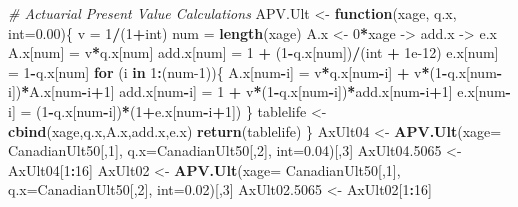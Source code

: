\documentclass[
]{book}
\newenvironment{Shaded}{\begin{snugshade}}{\end{snugshade}}
\newcommand{\CommentTok}[1]{\textcolor[rgb]{0.56,0.35,0.01}{\textit{#1}}}
\newcommand{\ControlFlowTok}[1]{\textcolor[rgb]{0.13,0.29,0.53}{\textbf{#1}}}
\newcommand{\DataTypeTok}[1]{\textcolor[rgb]{0.13,0.29,0.53}{#1}}
\newcommand{\DecValTok}[1]{\textcolor[rgb]{0.00,0.00,0.81}{#1}}
\newcommand{\FloatTok}[1]{\textcolor[rgb]{0.00,0.00,0.81}{#1}}
\newcommand{\KeywordTok}[1]{\textcolor[rgb]{0.13,0.29,0.53}{\textbf{#1}}}
\newcommand{\NormalTok}[1]{#1}
\newcommand{\OperatorTok}[1]{\textcolor[rgb]{0.81,0.36,0.00}{\textbf{#1}}}
\newcommand{\StringTok}[1]{\textcolor[rgb]{0.31,0.60,0.02}{#1}}
\begin{document}
\begin{Shaded}
\begin{Highlighting}[]
\CommentTok{#  Actuarial Present Value Calculations}
\NormalTok{APV.Ult <-}\StringTok{ }\ControlFlowTok{function}\NormalTok{(xage, q.x, }\DataTypeTok{int=}\FloatTok{0.00}\NormalTok{)\{}
\NormalTok{  v =}\StringTok{ }\DecValTok{1}\OperatorTok{/}\NormalTok{(}\DecValTok{1}\OperatorTok{+}\NormalTok{int)}
\NormalTok{  num =}\StringTok{ }\KeywordTok{length}\NormalTok{(xage)}
\NormalTok{  A.x <-}\StringTok{ }\DecValTok{0}\OperatorTok{*}\NormalTok{xage ->}\StringTok{ }\NormalTok{add.x ->}\StringTok{ }\NormalTok{e.x}
\NormalTok{  A.x[num] =}\StringTok{ }\NormalTok{v}\OperatorTok{*}\NormalTok{q.x[num]}
\NormalTok{  add.x[num] =}\StringTok{ }\DecValTok{1} \OperatorTok{+}\StringTok{ }\NormalTok{(}\DecValTok{1}\OperatorTok{-}\NormalTok{q.x[num])}\OperatorTok{/}\NormalTok{(int }\OperatorTok{+}\StringTok{ }\FloatTok{1e-12}\NormalTok{)}
\NormalTok{  e.x[num] =}\StringTok{ }\DecValTok{1}\OperatorTok{-}\NormalTok{q.x[num]}
  \ControlFlowTok{for}\NormalTok{ (i }\ControlFlowTok{in} \DecValTok{1}\OperatorTok{:}\NormalTok{(num}\DecValTok{-1}\NormalTok{))\{}
\NormalTok{    A.x[num}\OperatorTok{-}\NormalTok{i] =}\StringTok{ }\NormalTok{v}\OperatorTok{*}\NormalTok{q.x[num}\OperatorTok{-}\NormalTok{i] }\OperatorTok{+}\StringTok{ }\NormalTok{v}\OperatorTok{*}\NormalTok{(}\DecValTok{1}\OperatorTok{-}\NormalTok{q.x[num}\OperatorTok{-}\NormalTok{i])}\OperatorTok{*}\NormalTok{A.x[num}\OperatorTok{-}\NormalTok{i}\OperatorTok{+}\DecValTok{1}\NormalTok{]}
\NormalTok{    add.x[num}\OperatorTok{-}\NormalTok{i] =}\StringTok{ }\DecValTok{1} \OperatorTok{+}\StringTok{ }\NormalTok{v}\OperatorTok{*}\NormalTok{(}\DecValTok{1}\OperatorTok{-}\NormalTok{q.x[num}\OperatorTok{-}\NormalTok{i])}\OperatorTok{*}\NormalTok{add.x[num}\OperatorTok{-}\NormalTok{i}\OperatorTok{+}\DecValTok{1}\NormalTok{] }
\NormalTok{    e.x[num}\OperatorTok{-}\NormalTok{i] =}\StringTok{  }\NormalTok{(}\DecValTok{1}\OperatorTok{-}\NormalTok{q.x[num}\OperatorTok{-}\NormalTok{i])}\OperatorTok{*}\NormalTok{(}\DecValTok{1}\OperatorTok{+}\NormalTok{e.x[num}\OperatorTok{-}\NormalTok{i}\OperatorTok{+}\DecValTok{1}\NormalTok{])}
\NormalTok{    \}}
\NormalTok{  tablelife <-}\StringTok{ }\KeywordTok{cbind}\NormalTok{(xage,q.x,A.x,add.x,e.x)}
  \KeywordTok{return}\NormalTok{(tablelife)}
\NormalTok{\}}
\NormalTok{AxUlt04 <-}\StringTok{ }\KeywordTok{APV.Ult}\NormalTok{(}\DataTypeTok{xage=}\NormalTok{ CanadianUlt50[,}\DecValTok{1}\NormalTok{], }\DataTypeTok{q.x=}\NormalTok{CanadianUlt50[,}\DecValTok{2}\NormalTok{], }\DataTypeTok{int=}\FloatTok{0.04}\NormalTok{)[,}\DecValTok{3}\NormalTok{]}
\NormalTok{AxUlt04}\FloatTok{.5065}\NormalTok{ <-}\StringTok{ }\NormalTok{AxUlt04[}\DecValTok{1}\OperatorTok{:}\DecValTok{16}\NormalTok{]}
\NormalTok{AxUlt02 <-}\StringTok{ }\KeywordTok{APV.Ult}\NormalTok{(}\DataTypeTok{xage=}\NormalTok{ CanadianUlt50[,}\DecValTok{1}\NormalTok{], }\DataTypeTok{q.x=}\NormalTok{CanadianUlt50[,}\DecValTok{2}\NormalTok{], }\DataTypeTok{int=}\FloatTok{0.02}\NormalTok{)[,}\DecValTok{3}\NormalTok{]}
\NormalTok{AxUlt02}\FloatTok{.5065}\NormalTok{ <-}\StringTok{ }\NormalTok{AxUlt02[}\DecValTok{1}\OperatorTok{:}\DecValTok{16}\NormalTok{]}


\end{Highlighting}
\end{Shaded}
\end{document}
